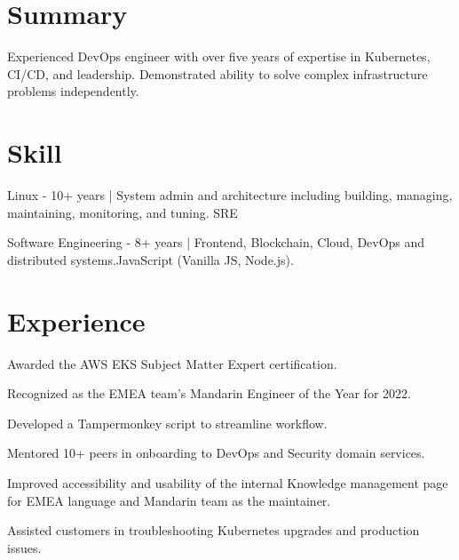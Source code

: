 \documentclass[]{deedy-resume-openfont}
\begin{document}
\begin{minipage}[t]{1\textwidth}



\section{Summary}
\begin{summary}
  Experienced DevOps engineer with over five years of expertise in Kubernetes, CI/CD, and leadership. Demonstrated ability to solve complex infrastructure problems independently.
\end{summary}

\section{Skill}
\vspace{\topsep}
\begin{tightemize}
    \item Linux - 10+ years | System admin and architecture including building, managing, maintaining, monitoring, and tuning. SRE
    \item Software Engineering - 8+ years | Frontend, Blockchain, Cloud, DevOps and distributed systems.JavaScript (Vanilla JS, Node.js).
\end{tightemize}


\section{Experience}

\begin{tightemize}
    \item Awarded the AWS EKS Subject Matter Expert certification. \null\hfill{}
    \item Recognized as the EMEA team's Mandarin Engineer of the Year for 2022.
    \item Developed a Tampermonkey script to streamline workflow.
    \item Mentored 10+ peers in onboarding to DevOps and Security domain services.
    \item Improved accessibility and usability of the internal Knowledge management page for EMEA language and Mandarin team as the maintainer.
    \item Assisted customers in troubleshooting Kubernetes upgrades and production issues.
\end{tightemize}
\sectionsep



\end{minipage}
\end{document}
